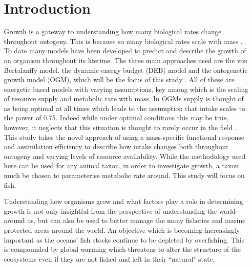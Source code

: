 \documentclass[a4paper, 11pt, hidelinks]{article} %
\begin{document}
	\tableofcontents
	\newpage

\section{Introduction}
	\linenumbers
	Growth is a gateway to understanding how many biological rates change throughout ontogeny.  This is because so many biological rates scale with mass \parencite{Kleiber1932}.  To date many models have been developed to predict and describe the growth of an organism throughout its lifetime.  The three main approaches used are the von Bertalanffy model, the dynamic energy budget (DEB) model and the ontogenetic growth model (OGM), which will be the focus of this study \parencite{Putter1918, vonBertalanffy1938, Kooijman1986, West2001}.  All of these are energetic based models with varying assumptions, key among which is the scaling of resource supply and metabolic rate with mass.   In OGMs supply is thought of as being optimal at all times which leads to the assumption that intake scales to the power of 0.75.  Indeed while under optimal conditions this may be true, however, it neglects that this situation is thought to rarely occur in the field \parencite{Pawar2012}.
	This study takes the novel approach of using a mass-specific functional response and assimilation efficiency to describe how intake changes both throughout ontogeny and varying levels of resource availability. While the methodology used here can be used for any animal taxon, in order to investigate growth, a taxon much be chosen to parameterise metabolic rate around.  This study will focus on fish.
		
	Understanding how organisms grow and what factors play a role in determining growth is not only insightful from the perspective of understanding the world around us, but can also be used to better manage the many fisheries and marine protected areas around the world.  An objective which is becoming increasingly important as the oceans' fish stocks continue to be depleted by overfishing. 
	This is compounded by global warming which threatens to alter the structure of the ecosystems even if they are not fished and left in their ``natural" state. 
	
\end{document}
